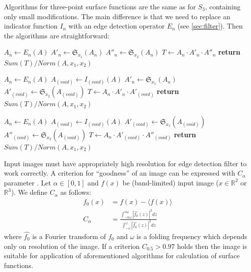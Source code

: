 \documentclass[1p]{elsarticle}
\begin{document}
Algorithms for three-point surface functions are the same as for $S_3$,
containing only small modifications. The main difference is that we need to
replace an indicator function $I_n$ with an edge detection operator $E_n$
(see \ref{sec:filter}). Then the algorithms are straightforward:
\begin{algorithmic}[1]
  \State $A_n \gets E_n (A)$
  \State $A'_n \gets \mathfrak{S}_{x_1}(A_n)$
  \State $A''_n \gets \mathfrak{S}_{x_2}(A_n)$
  \State $T \gets A_n \cdot A'_n \cdot A''_n$
  \State \textbf{return} $Sum(T) / Norm(A, x_1, x_2)$
  \EndProcedure

  \State $A_n \gets E_n (A)$
  \State $A_{(void)} \gets I_{(void)} (A)$
  \State $A'_n \gets \mathfrak{S}_{x_1}(A_n)$
  \State $A'_{(void)} \gets \mathfrak{S}_{x_2}(A_{(void)})$
  \State $T \gets A_n \cdot A'_n \cdot A'_{(void)}$
  \State \textbf{return} $Sum(T) / Norm(A, x_1, x_2)$
  \EndProcedure

  \State $A_n \gets E_n (A)$
  \State $A_{(void)} \gets I_{(void)} (A)$
  \State $A'_{(void)} \gets \mathfrak{S}_{x_1}(A_{(void)})$
  \State $A''_{(void)} \gets \mathfrak{S}_{x_2}(A_{(void)})$
  \State $T \gets A_n \cdot A'_{(void)} \cdot A''_{(void)}$
  \State \textbf{return} $Sum(T) / Norm(A, x_1, x_2)$
  \EndProcedure
\end{algorithmic}

Input images must have appropriately high resolution for edge detection filter
to work correctly. A criterion for ``goodness'' of an image can be expressed
with $C_{\alpha}$ parameter \cite{samarin2023robust}. Let $\alpha \in [0, 1]$
and $f(x)$ be (band-limited) input image ($x \in \mathbb{R}^2$ or
$\mathbb{R}^3$). We define $C_\alpha$ as follows:
\begin{equation}
  \begin{aligned}
    f_0(x) &= f(x) - \langle f(x) \rangle \\
    C_\alpha &= \frac{\int_{-\alpha\omega}^{\alpha\omega} |\hat{f_0}(z)|^2
      dz}{\int_{-\omega}^{\omega} |\hat{f_0}(z)|^2 dz}
  \end{aligned}
\end{equation}
where $\hat{f_0}$ is a Fourier transform of $f_0$ and $\omega$ is a folding
frequency which depends only on resolution of the image. If a criterion
$C_{0.5} > 0.97$ holds then the image is suitable for application of
aforementioned algorithms for calculation of surface functions.
\end{document}
